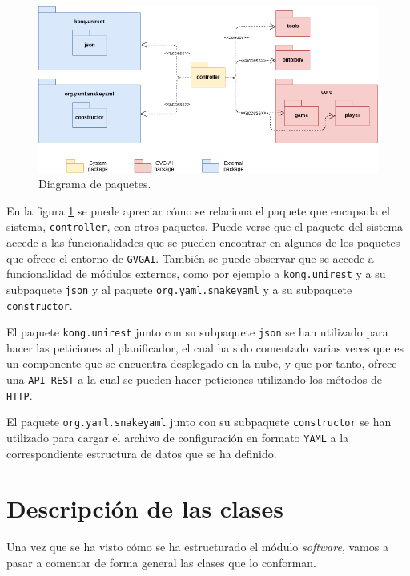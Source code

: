\begin{figure}[H]
    \centering
    \includegraphics[scale=0.48]{img/CH07/package_diagram.png}
    \caption{Diagrama de paquetes.}
    \label{fig:package_diagram}
\end{figure}

En la figura \ref{fig:package_diagram} se puede apreciar cómo se relaciona el paquete
que encapsula el sistema, \texttt{controller}, con otros paquetes. Puede verse que el paquete del sistema
accede a las funcionalidades que se pueden encontrar en algunos de los paquetes que ofrece el entorno de
\texttt{GVGAI}. También se puede observar que se accede a funcionalidad de módulos externos, como por
ejemplo a \texttt{kong.unirest} y a su subpaquete \texttt{json} y al paquete \texttt{org.yaml.snakeyaml}
y a su subpaquete \texttt{constructor}.

El paquete \texttt{kong.unirest} junto con su subpaquete \texttt{json} se han utilizado
para hacer las peticiones al planificador, el cual ha sido comentado varias veces que es un componente
que se encuentra desplegado en la nube, y que por tanto, ofrece una \texttt{API REST} a la cual se
pueden hacer peticiones utilizando los métodos de \texttt{HTTP}.

El paquete \texttt{org.yaml.snakeyaml} junto con su subpaquete \texttt{constructor} se han
utilizado para cargar el archivo de configuración en formato \texttt{YAML} a la correspondiente
estructura de datos que se ha definido.

\section{Descripción de las clases}

Una vez que se ha visto cómo se ha estructurado el módulo \textit{software}, vamos
a pasar a comentar de forma general las clases que lo conforman.

